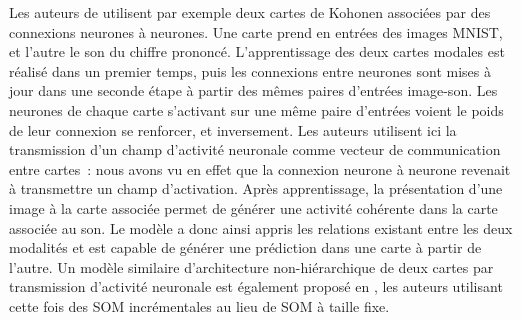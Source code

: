\documentclass[../main]{subfiles}
\begin{document}
Les auteurs de \cite{khacef_brain-inspired_2020} utilisent par exemple deux cartes de Kohonen associées par des connexions neurones à neurones. Une carte prend en entrées des images MNIST, et l'autre le son du chiffre prononcé. L'apprentissage des deux cartes modales est réalisé dans un premier temps, puis les connexions entre neurones sont mises à jour dans une seconde étape à partir des mêmes paires d'entrées image-son. Les neurones de chaque carte s'activant sur une même paire d'entrées voient le poids de leur connexion se renforcer, et inversement. Les auteurs utilisent ici la transmission d'un champ d'activité neuronale comme vecteur de communication entre cartes~: nous avons vu en effet que la connexion neurone à neurone revenait à transmettre un champ d'activation.
Après apprentissage, la présentation d'une image à la carte associée permet de générer une activité cohérente dans la carte associée au son. Le modèle a donc ainsi appris les relations existant entre les deux modalités et est capable de générer une prédiction dans une carte à partir de l'autre.
Un modèle similaire d'architecture non-hiérarchique de deux cartes par transmission d'activité neuronale est également proposé en \cite{jayaratne_bio-inspired_2018}, les auteurs utilisant cette fois des SOM incrémentales au lieu de SOM à taille fixe.
\end{document}
